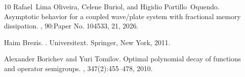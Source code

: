 \documentclass[12pt,reqno]{article}
\begin{document}
\begin{thebibliography}{10}
Rafael~Lima Oliveira, Celene Buriol, and Higidio Portillo~Oquendo.
\newblock Asymptotic behavior for a coupled wave/plate system with fractional
  memory dissipation.
, 90:Paper No. 104533, 21,
  2026.

Haim Brezis.
.
\newblock Universitext. Springer, New York, 2011.

Alexander Borichev and Yuri Tomilov.
\newblock Optimal polynomial decay of functions and operator semigroups.
, 347(2):455--478, 2010.

\end{thebibliography}

	
\end{document}
